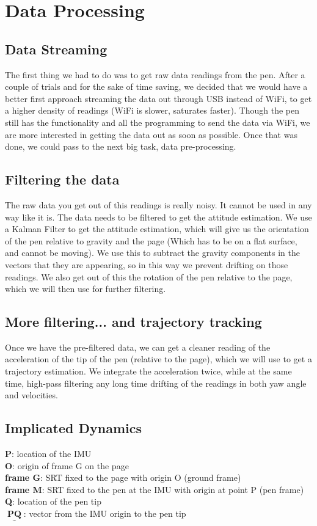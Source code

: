 \documentclass{article}
\newcommand{\tmop}[1]{\ensuremath{\operatorname{#1}}}
\begin{document}
\section{Data Processing} 

\subsection{Data Streaming}
 
The first thing we had to do was to get raw data readings from the pen. After a couple of trials and for the sake of time saving, we decided that we would have a better first approach streaming the data out through USB instead of WiFi, to get a higher density of readings (WiFi is slower, saturates faster). Though the pen still has the functionality and all the programming to send the data via WiFi, we are more interested in getting the data out as soon as possible. Once that was done, we could pass to the next big task, data pre-processing.

\subsection{Filtering the data}

The raw data you get out of this readings is really noisy. It cannot be used in any way like it is. The data needs to be filtered to get the attitude estimation. We use a Kalman Filter to get the attitude estimation, which will give us the orientation of the pen relative to gravity and the page (Which has to be on a flat surface, and cannot be moving).
We use this to subtract the gravity components in the vectors that they are appearing, so in this way we prevent drifting on those readings. We also get out of this the rotation of the pen relative to the page, which we will then use for further filtering.

\subsection{More filtering... and trajectory tracking}

Once we have the pre-filtered data, we can get a cleaner reading of the acceleration of the tip of the pen (relative to the page), which we will use to get a trajectory estimation. We integrate the acceleration twice, while at the same time, high-pass filtering any long time drifting of the readings in both yaw angle and velocities.


\subsection{Implicated Dynamics}
\textbf{P}: location of the IMU \\
\textbf{O}: origin of frame G on the page \\
\textbf{frame G}: SRT fixed to the page with origin O (ground frame) \\
\textbf{frame M}: SRT fixed to the pen at the IMU with origin at point P (pen frame) \\
\textbf{Q}: location of the pen tip \\
$\underset{\mbox{\textasciitilde}}{\tmop{\textbf{PQ}}}$: vector from the IMU origin to
the pen tip
\end{document}
